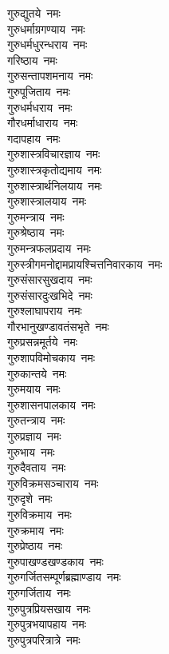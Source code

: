 \begin{multicols}{2}
\begin{flushleft}
गुरुद्युतये~नमः\\
गुरुधर्माग्रगण्याय~नमः\\
गुरुधर्मधुरन्धराय~नमः\\
गरिष्ठाय~नमः\\
गुरुसन्तापशमनाय~नमः\\
गुरुपूजिताय~नमः\\
गुरुधर्मधराय~नमः\\
गौरधर्माधाराय~नमः\\
गदापहाय~नमः\\
गुरुशास्त्रविचारज्ञाय~नमः\hfill{}\\
गुरुशास्त्रकृतोद्यमाय~नमः\\
गुरुशास्त्रार्थनिलयाय~नमः\\
गुरुशास्त्रालयाय~नमः\\
गुरुमन्त्राय~नमः\\
गुरुश्रेष्ठाय~नमः\\
गुरुमन्त्रफलप्रदाय~नमः\\
गुरुस्त्रीगमनोद्दाम\-प्रायश्चित्तनिवारकाय~नमः\\
गुरुसंसारसुखदाय~नमः\\
गुरुसंसारदुःखभिदे~नमः\\
गुरुश्लाघापराय~नमः\hfill{}\\
गौरभानुखण्डावतंसभृते~नमः\\
गुरुप्रसन्नमूर्तये~नमः\\
गुरुशापविमोचकाय~नमः\\
गुरुकान्तये~नमः\\
गुरुमयाय~नमः\\
गुरुशासनपालकाय~नमः\\
गुरुतन्त्राय~नमः\\
गुरुप्रज्ञाय~नमः\\
गुरुभाय~नमः\\
गुरुदैवताय~नमः\hfill{}\\
गुरुविक्रमसञ्चाराय~नमः\\
गुरुदृशे~नमः\\
गुरुविक्रमाय~नमः\\
गुरुक्रमाय~नमः\\
गुरुप्रेष्ठाय~नमः\\
गुरुपाखण्डखण्डकाय~नमः\\
गुरुगर्जितसम्पूर्णब्रह्माण्डाय~नमः\\
गुरुगर्जिताय~नमः\\
गुरुपुत्रप्रियसखाय~नमः\\
गुरुपुत्रभयापहाय~नमः\hfill{}\\
गुरुपुत्रपरित्रात्रे~नमः\\

\end{flushleft}
\end{multicols}
